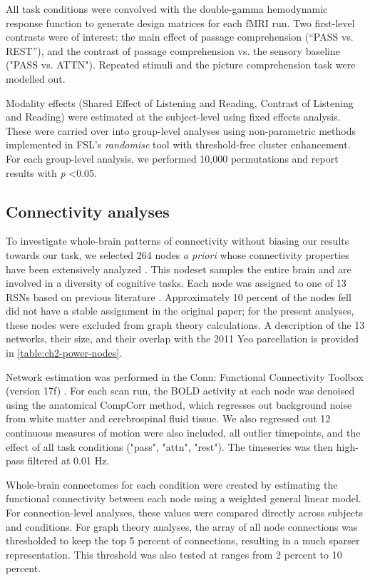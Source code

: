 All task conditions were convolved with the double-gamma hemodynamic response function to generate design matrices for each fMRI run. Two first-level contrasts were of interest: the main effect of passage comprehension (“PASS vs. REST”), and the contrast of passage comprehension vs. the sensory baseline ("PASS vs. ATTN"). Repeated stimuli and the picture comprehension task were modelled out.

Modality effects (Shared Effect of Listening and Reading, Contrast of Listening and Reading) were estimated at the subject-level using fixed effects analysis. These were carried over into group-level analyses using non-parametric methods implemented in FSL’s \textit{randomise} tool with threshold-free cluster enhancement. For each group-level analysis, we performed 10,000 permutations and report results with \textit{p} \textless 0.05. 

\subsection{Connectivity analyses}

To investigate whole-brain patterns of connectivity without biasing our results towards our task, we selected 264 nodes \textit{a priori} whose connectivity properties have been extensively analyzed \cite{Power2011}. This nodeset samples the entire brain and are involved in a diversity of cognitive tasks. Each node was assigned to one of 13 RSNs based on previous literature \cite{Power2013}. Approximately 10 percent of the nodes fell did not have a stable assignment in the original paper; for the present analyses, these nodes were excluded from graph theory calculations. A description of the 13 networks, their size, and their overlap with the 2011 Yeo parcellation is provided in \ref{table:ch2-power-nodes}. 

Network estimation was performed in the Conn: Functional Connectivity Toolbox (version 17f) \cite{Nieto-castanon}. For each scan run, the BOLD activity at each node was denoised using the anatomical CompCorr method, which regresses out background noise from white matter and cerebrospinal fluid tissue. We also regressed out 12 continuous measures of motion were also included, all outlier timepoints, and the effect of all task conditions ("pass", "attn", "rest"). The timeseries was then high-pass filtered at 0.01 Hz.

Whole-brain connectomes for each condition were created by estimating the functional connectivity between each node using a weighted general linear model. For connection-level analyses, these values were compared directly across subjects and conditions. For graph theory analyses, the array of all node connections was thresholded to keep the top 5 percent of connections, resulting in a much sparser representation. This threshold was also tested at ranges from 2 percent to 10 percent.

